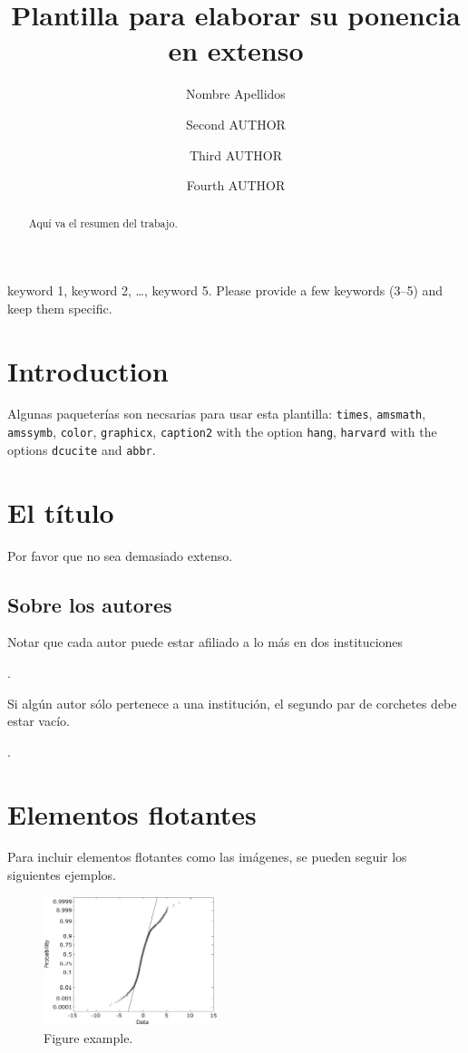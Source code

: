 \documentclass{siep}
\title[T\'itulo Corto Aqu\'i]{Plantilla para elaborar su ponencia en extenso}
\author[ad1][ad2]{Nombre Apellidos}
\author[ad1][]{Second AUTHOR}
\author[ad1][ad2]{Third AUTHOR}
\author[ad2][]{Fourth AUTHOR}
\begin{document}
\begin{abstract}
Aqu\'i va el resumen del trabajo.
\end{abstract}

\begin{keywords}
keyword 1, keyword 2, \dots, keyword 5. Please provide a few keywords (3--5) and keep them specific.
\end{keywords}
\maketitle

\section{Introduction}
Algunas paqueter\'ias son necsarias para usar esta plantilla: \verb+times+, \verb+amsmath+, \verb+amssymb+, \verb+color+, \verb+graphicx+, \verb+caption2+ with the option \verb+hang+, \verb+harvard+ with the options \verb+dcucite+ and \verb+abbr+.


\section{El t\'itulo}

Por favor que no sea demasiado extenso.

\medskip


\subsection{Sobre los autores}
Notar que cada autor puede estar afiliado a lo m\'as en dos instituciones

\medskip
{}.

\medskip\noindent
Si alg\'un autor s\'olo pertenece a una instituci\'on, el segundo par de corchetes debe estar vac\'io.


\medskip
{}.


\section{Elementos flotantes}

Para incluir elementos flotantes como las im\'agenes, se pueden seguir los siguientes ejemplos.

\begin{figure}[!b]
 \centering
  \includegraphics[width=0.45\textwidth]{fig1}
 \caption{Figure example.}
  \label{fig1}
\end{figure}
\end{document}
